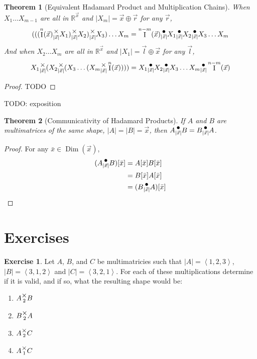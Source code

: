 \documentclass[12pt]{book}
\theoremstyle{plain}
\newtheorem{theorem}{Theorem}[chapter]
\theoremstyle{definition}
\newtheorem{exercise}{Exercise}[chapter]
\theoremstyle{ppart}
\theoremstyle{case}
\theoremstyle{solution}
\DeclareMathOperator{\Dim}{Dim}
\DeclareMathOperator{\Ident}{I}
\newcommand{\mmult}[1]{\text{\raisebox{1ex}{$\underset{#1}{\times}$}}}
\newcommand{\dmult}[1]{\text{\raisebox{1ex}{$\underset{#1}{\,\bullet\,}$}}}
\newcommand{\shape}[1]{\left|#1\right|}
\begin{document}
\begin{theorem}[Equivalent Hadamard Product and Multiplication Chains]
When $X_1 \ldots X_{m-1}$ are all in $\mathbb{R}^{\vec{x}}$ and
$\shape{X_m} = \vec{x} \oplus \vec{r}$ for any $\vec{r}$,
\[
  (((\Ident^n(\vec{x})
  \mmult{\shape{\vec{x}}} X_1) \mmult{\shape{\vec{x}}} X_2) \mmult{\shape{\vec{x}}} X_3)
  \ldots X_m
  =
  \Ident^{n-m}(\vec{x})
  \dmult{\shape{\vec{x}}} X_1 \dmult{\shape{\vec{x}}} X_2 \dmult{\shape{\vec{x}}} X_3
  \ldots X_m
\]
And when $X_2 \ldots X_m$ are all in $\mathbb{R}^{\vec{x}}$ and
$\shape{X_1} = \vec{l} \oplus \vec{x}$ for any $\vec{l}$,
\[
  X_1 \mmult{\shape{\vec{x}}} (X_2 \mmult{\shape{\vec{x}}} (X_3
  \ldots (X_m \mmult{\shape{\vec{x}}} 
  \Ident^n(\vec{x}))))
  =
  X_1 \dmult{\shape{\vec{x}}} X_2 \dmult{\shape{\vec{x}}} X_3
  \ldots X_m \dmult{\shape{\vec{x}}} 
  \Ident^{n-m}(\vec{x})
\]
\end{theorem}
\begin{proof}
TODO 
\end{proof}

TODO: exposition

\begin{theorem}[Communicativity of Hadamard Products]
If $A$ and $B$ are multimatrices of the same shape, $\shape{A} = \shape{B} = \vec{x}$,
then $A \dmult{\shape{\vec{x}}} B = B \dmult{\shape{\vec{x}}} A$.
\end{theorem}
\begin{proof}
For any $\bar{x} \in \Dim(\vec{x})$,
\begin{align*}
(A \dmult{\shape{\vec{x}}} B)[\bar{x}]
  &= A[\bar{x}] B[\bar{x}] \\
  &= B[\bar{x}] A[\bar{x}] \\
  &= (B \dmult{\shape{\vec{x}}} A)[\bar{x}]
\end{align*}
\end{proof}

\section{Exercises}

\begin{exercise}
Let $A$, $B$, and $C$ be multimatricies such that $\shape{A} = \left<1,2,3\right>$,
$\shape{B} = \left<3,1,2\right>$ and $\shape{C} = \left<3,2,1\right>$. For each of these
multiplications determine if it is valid, and if so, what the resulting
shape would be:
\begin{enumerate}
\item $A \mmult{2} B$
\item $B \mmult{2} A$
\item $A \mmult{2} C$
\item $A \mmult{1} C$
\end{enumerate}
\end{exercise}
\end{document}
